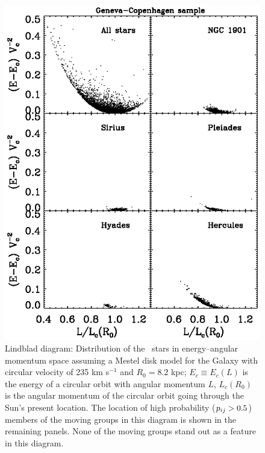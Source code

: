 \clearpage
\begin{figure}
\begin{center}
\includegraphics{figs_groups/sellwood_gcs_mg.ps}
\end{center}
\caption[Lindblad diagram: Distribution of the \gcsabb\ stars in
  energy--angular momentum space assuming a Mestel disk model for the
  Galaxy]{Lindblad diagram: Distribution of the \gcsabb\ stars in
  energy--angular momentum space assuming a Mestel disk model for the
  Galaxy with circular velocity of 235 km s$^{-1}$ and $R_0 = 8.2$
  kpc; $E_c \equiv E_c(L)$ is the energy of a circular orbit with
  angular momentum $L$, $L_c(R_0)$ is the angular momentum of the
  circular orbit going through the Sun's present location. The
  location of high probability ($p_{ij} > 0.5$) members of the moving
  groups in this diagram is shown in the remaining panels. None of the
  moving groups stand out as a feature in this
  diagram.}\label{fig:sellwood}
\end{figure}


